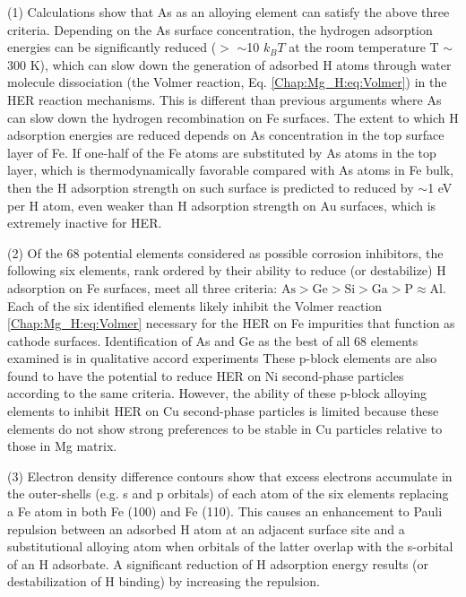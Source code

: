  (1) Calculations show that As as an alloying element can satisfy the above three criteria. Depending on the As surface concentration, the hydrogen adsorption energies can be significantly reduced ($>$ $\sim$10 $k_{B}T$ at the room temperature T $\sim$ 300 K), which can slow down the generation of adsorbed H atoms through water molecule dissociation (the Volmer reaction, Eq. \ref{Chap:Mg_H:eq:Volmer}) in the HER reaction mechanisms. This is different than previous arguments where As can slow down the hydrogen recombination on Fe surfaces. The extent to which H adsorption energies are reduced depends on As concentration in the top surface layer of Fe. If one-half of the Fe atoms are substituted by As atoms in the top layer, which is thermodynamically favorable compared with As atoms in Fe bulk, then the H adsorption strength on such surface is predicted to reduced by $\sim$1 eV per H atom, even weaker than H adsorption strength on Au surfaces, which is extremely inactive for HER.
 
(2) Of the 68 potential elements considered as possible corrosion inhibitors, the following six elements, rank ordered by their ability to reduce (or destabilize) H adsorption on Fe surfaces, meet all three criteria: $\text{As} > \text{Ge} > \text{Si} > \text{Ga} > \text{P} \approx \text{Al}$. Each of the six identified elements likely inhibit the Volmer reaction \ref{Chap:Mg_H:eq:Volmer} necessary for the HER on Fe impurities that function as cathode surfaces. Identification of As and Ge as the best of all 68 elements examined is in qualitative accord experiments These p-block elements are also found to have the potential to reduce \ac{HER} on Ni second-phase particles according to the same criteria. However, the ability of these p-block alloying elements to inhibit \ac{HER} on Cu second-phase particles is limited because these elements do not show strong preferences to be stable in Cu particles relative to those in Mg matrix.

(3) Electron density difference contours show that excess electrons accumulate in the outer-shells (e.g. s and p orbitals) of each atom of the six elements replacing a Fe atom in both Fe (100) and Fe (110). This causes an enhancement to Pauli repulsion between an adsorbed H atom at an adjacent surface site and a substitutional alloying atom when orbitals of the latter overlap with the s-orbital of an H adsorbate. A significant reduction of H adsorption energy results (or destabilization of H binding) by increasing the repulsion. 
